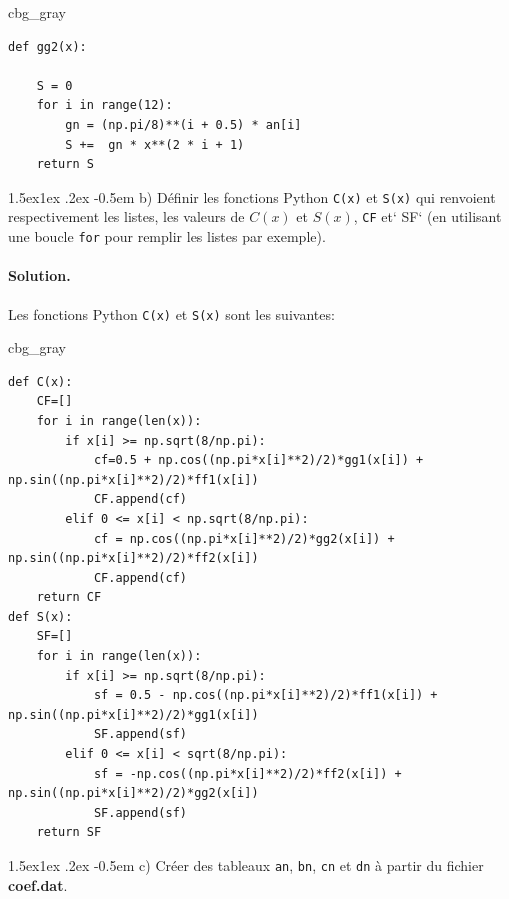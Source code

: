 \documentclass[%
oneside,                 %
final,                   %
10pt,french]{article}
\makeatletter
\newenvironment{_cod_tight}[1]{
   \def\FrameCommand{\colorbox{#1}}
   \FrameRule0.6pt\MakeFramed {\FrameRestore}\vskip3mm}
   {\vskip0mm\endMakeFramed}
\newenvironment{cod}[1]{
\bgroup\rmfamily
\fboxsep=0mm\relax
\begin{_cod_tight}{#1}
\list{}{\parsep=-2mm\parskip=0mm\topsep=0pt\leftmargin=2mm
\rightmargin=2\leftmargin\leftmargin=4pt\relax}
\item\relax}
{\endlist\end{_cod_tight}\egroup}
\newenvironment{doconceexercise}{}{}
\newcommand\subex{\@startsection{paragraph}{4}{\z@}%
                  {1.5ex\@plus1ex \@minus.2ex}%
                  {-0.5em}%
                  {\normalfont\normalsize\bfseries}}
\makeatother
\begin{document}
\begin{doconceexercise}
\begin{cod}{cbg_gray}
\begin{verbatim}
def gg2(x):

    S = 0
    for i in range(12):
        gn = (np.pi/8)**(i + 0.5) * an[i]
        S +=  gn * x**(2 * i + 1)
    return S
\end{verbatim}
\end{cod}
\noindent


\subex{b)}
Définir les fonctions Python \texttt{C(x)} et \texttt{S(x)} qui renvoient respectivement les listes, les valeurs de $C(x)$ et $S(x)$, \texttt{CF} et` SF` (en utilisant une boucle \texttt{for} pour remplir les listes par exemple).


\paragraph{Solution.}
Les fonctions Python \texttt{C(x)} et \texttt{S(x)} sont les suivantes:

\begin{cod}{cbg_gray}\begin{verbatim}
def C(x):
    CF=[]
    for i in range(len(x)):
        if x[i] >= np.sqrt(8/np.pi):
            cf=0.5 + np.cos((np.pi*x[i]**2)/2)*gg1(x[i]) + np.sin((np.pi*x[i]**2)/2)*ff1(x[i])
            CF.append(cf)
        elif 0 <= x[i] < np.sqrt(8/np.pi):
            cf = np.cos((np.pi*x[i]**2)/2)*gg2(x[i]) + np.sin((np.pi*x[i]**2)/2)*ff2(x[i])
            CF.append(cf)
    return CF
def S(x):
    SF=[]
    for i in range(len(x)):
        if x[i] >= np.sqrt(8/np.pi):
            sf = 0.5 - np.cos((np.pi*x[i]**2)/2)*ff1(x[i]) + np.sin((np.pi*x[i]**2)/2)*gg1(x[i])
            SF.append(sf)
        elif 0 <= x[i] < sqrt(8/np.pi):
            sf = -np.cos((np.pi*x[i]**2)/2)*ff2(x[i]) + np.sin((np.pi*x[i]**2)/2)*gg2(x[i])
            SF.append(sf)
    return SF
\end{verbatim}
\end{cod}
\noindent


\subex{c)}
Créer des tableaux \texttt{an}, \texttt{bn}, \texttt{cn} et \texttt{dn} à partir du fichier \textbf{coef.dat}.



\end{doconceexercise}
\end{document}

